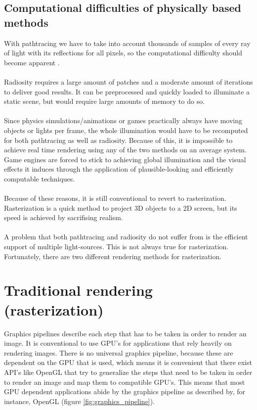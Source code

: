 \documentclass{ACGSeminar}
\begin{document}
	\subsection{Computational difficulties of physically based methods}
	With pathtracing we have to take into account thousands of samples of every ray of light with its reflections for all pixels, so the computational difficulty should become apparent \cite{DST}. \\\\
	Radiosity requires a large amount of patches and a moderate amount of iterations to deliver good results. It can be preprocessed and quickly loaded to illuminate a static scene, but would require large amounts of memory to do so. \\\\
	Since physics simulations/animations or games practically always have moving objects or lights per frame, the whole illumination would have to be recomputed for both pathtracing as well as radiosity. Because of this, it is impossible to achieve real time rendering using any of the two methods on an average system. Game engines are forced to stick to achieving global illumination and the visual effects it induces through the application of plausible-looking and efficiently computable techniques. \\\\
	Because of these reasons, it is still conventional to revert to rasterization. Rasterization is a quick method to project 3D objects to a 2D screen, but its speed is achieved by sacrifising realism. \\\\
	A problem that both pathtracing and radiosity do not suffer from is the efficient support of multiple light-sources. This is not always true for rasterization. Fortunately, there are two different rendering methods for rasterization. 

\section{Traditional rendering (rasterization)}
	Graphics pipelines describe each step that has to be taken in order to render an image. It is conventional to use GPU's for applications that rely heavily on rendering images. There is no universal graphics pipeline, because these are dependent on the GPU that is used, which means it is convenient that there exist API's like OpenGL that try to generalize the steps that need to be taken in order to render an image and map them to compatible GPU's. This means that most GPU dependent applications abide by the graphics pipeline as described by, for instance, OpenGL (figure \ref{fig:graphics_pipeline}).
	
\end{document}
